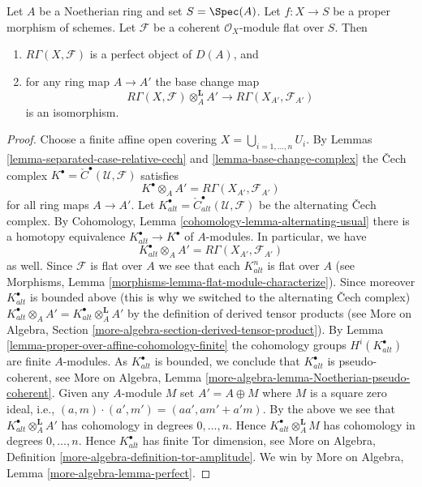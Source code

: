 \begin{lemma}
\label{lemma-perfect-direct-image}
Let $A$ be a Noetherian ring and set $S = \Spec(A)$. Let $f : X \to S$ be a
proper morphism of schemes. Let $\mathcal{F}$ be a coherent
$\mathcal{O}_X$-module flat over $S$. Then
\begin{enumerate}
\item $R\Gamma(X, \mathcal{F})$ is a perfect object of $D(A)$, and
\item for any ring map $A \to A'$ the base change map
$$
R\Gamma(X, \mathcal{F}) \otimes_A^{\mathbf{L}} A'
\longrightarrow
R\Gamma(X_{A'}, \mathcal{F}_{A'})
$$
is an isomorphism.
\end{enumerate}
\end{lemma}

\begin{proof}
Choose a finite affine open covering $X = \bigcup_{i = 1, \ldots, n} U_i$.
By Lemmas \ref{lemma-separated-case-relative-cech} and
\ref{lemma-base-change-complex} the {\v C}ech complex
$K^\bullet = {\check C}^\bullet(\mathcal{U}, \mathcal{F})$ satisfies
$$
K^\bullet \otimes_A A' = R\Gamma(X_{A'}, \mathcal{F}_{A'})
$$
for all ring maps $A \to A'$. Let
$K_{alt}^\bullet = {\check C}_{alt}^\bullet(\mathcal{U}, \mathcal{F})$
be the alternating {\v C}ech complex. By
Cohomology, Lemma \ref{cohomology-lemma-alternating-usual}
there is a homotopy equivalence $K_{alt}^\bullet \to K^\bullet$
of $A$-modules. In particular, we have
$$
K_{alt}^\bullet \otimes_A A' = R\Gamma(X_{A'}, \mathcal{F}_{A'})
$$
as well. Since $\mathcal{F}$ is flat over $A$ we see that each $K_{alt}^n$
is flat over $A$ (see
Morphisms, Lemma \ref{morphisms-lemma-flat-module-characterize}).
Since moreover $K_{alt}^\bullet$ is bounded above (this is why we switched
to the alternating {\v C}ech complex)
$K_{alt}^\bullet \otimes_A A' = K_{alt}^\bullet \otimes_A^{\mathbf{L}} A'$
by the definition of derived tensor products (see
More on Algebra, Section \ref{more-algebra-section-derived-tensor-product}).
By
Lemma \ref{lemma-proper-over-affine-cohomology-finite}
the cohomology groups $H^i(K_{alt}^\bullet)$ are finite $A$-modules.
As $K_{alt}^\bullet$ is bounded, we conclude that $K_{alt}^\bullet$
is pseudo-coherent, see
More on Algebra, Lemma \ref{more-algebra-lemma-Noetherian-pseudo-coherent}.
Given any $A$-module $M$ set $A' = A \oplus M$ where $M$ is a square zero
ideal, i.e., $(a, m) \cdot (a', m') = (aa', am' + a'm)$. By the
above we see that $K_{alt}^\bullet \otimes_A^\mathbf{L} A'$ has cohomology
in degrees $0, \ldots, n$. Hence $K_{alt}^\bullet \otimes_A^\mathbf{L} M$
has cohomology in degrees $0, \ldots, n$. Hence $K_{alt}^\bullet$ has
finite Tor dimension, see
More on Algebra, Definition \ref{more-algebra-definition-tor-amplitude}.
We win by More on Algebra, Lemma \ref{more-algebra-lemma-perfect}.
\end{proof}